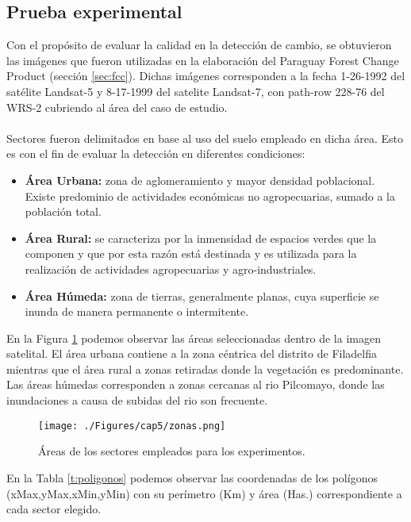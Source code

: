 \subsection{Prueba experimental} 
Con el prop\'osito de evaluar la calidad en la detecci\'on de cambio, se obtuvieron las im\'agenes que fueron utilizadas en la elaboraci\'on del Paraguay Forest Change Product (secci\'on \ref{sec:fcc}). Dichas im\'agenes corresponden a la fecha 1-26-1992	del sat\'elite Landsat-5 y 8-17-1999 del satelite Landsat-7, con path-row 228-76 del WRS-2 cubriendo al \'area del caso de estudio.\\~\\
Sectores fueron delimitados en base al uso del suelo empleado en dicha \'area. Esto es con el fin de evaluar la detecci\'on en diferentes condiciones:
\begin{itemize}
	\item \textbf{\'Area Urbana:} zona de aglomeramiento y mayor densidad poblacional. Existe predominio  de actividades econ\'omicas no agropecuarias, sumado a la poblaci\'on total. 
	\item \textbf{\'Area Rural:} se caracteriza por la inmensidad de espacios verdes que la componen y que por esta razón est\'a destinada y es utilizada para la realizaci\'on de actividades agropecuarias y agro-industriales.
	\item \textbf{\'Area H\'umeda:}	zona de tierras, generalmente planas, cuya superficie se inunda de manera permanente o intermitente.
\end{itemize}
En la Figura \ref{fig:zonasEva} podemos observar las \'areas seleccionadas dentro de la imagen satelital. El \'area urbana contiene a la zona c\'entrica del distrito de Filadelfia mientras que el \'area rural a zonas retiradas donde la vegetaci\'on es predominante. Las \'areas h\'umedas corresponden a zonas cercanas al rio Pilcomayo, donde las inundaciones a causa de subidas del rio son frecuente.   
\begin{figure}[H]
	\centering
	\texttt{[image: ./Figures/cap5/zonas.png]}
	\caption{\'Areas de los sectores empleados para los experimentos.}
	\label{fig:zonasEva}
\end{figure}
En la Tabla \ref{t:poligonos} podemos observar las coordenadas de los pol\'igonos (xMax,yMax,xMin,yMin) con su per\'imetro (Km) y \'area (Has.) correspondiente a cada sector elegido.

